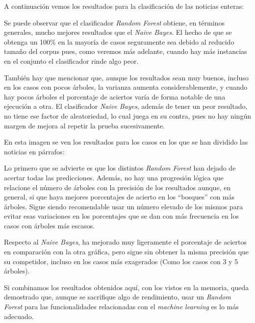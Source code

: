A continuación vemos los resultados para la clasificación de las noticias enteras:


Se puede observar que el clasificador \emph{Random Forest} obtiene, en términos generales, mucho mejores resultados que el \emph{Naive Bayes}. El hecho de que se obtenga un 100\% en la mayoría de casos seguramente sea debido al reducido tamaño del corpus pues, como veremos más adelante, cuando hay más instancias en el conjunto el clasificador rinde algo peor.

También hay que mencionar que, aunque los resultados sean muy buenos, incluso en los casos con pocos árboles, la varianza aumenta considerablemente, y cuando hay pocos árboles el porcentaje de aciertos varía de forma notable de una ejecución a otra. El clasificador \emph{Naive Bayes}, además de tener un peor resultado, no tiene ese factor de aleatoriedad, lo cual juega en su contra, pues no hay ningún margen de mejora al repetir la prueba sucesivamente.

En esta imagen se ven los resultados para los casos en los que se han dividido las noticias en párrafos:


Lo primero que se advierte es que los distintos \emph{Random Forest} han dejado de acertar todas las predicciones. Además, no hay una progresión lógica que relacione el número de árboles con la precisión de los resultados aunque, en general, si que haya mejores porcentajes de acierto en los ``bosques'' con más árboles. Sigue siendo recomendable usar un número elevado de los mismos para evitar esas variaciones en los porcentajes que se dan con más frecuencia en los casos con árboles más escasos.

Respecto al \emph{Naive Bayes}, ha mejorado muy ligeramente el porcentaje de aciertos en comparación con la otra gráfica, pero sigue sin obtener la misma precisión que su competidor, incluso en los casos más exagerados (Como los casos con 3 y 5 árboles).

Si combinamos los resultados obtenidos aquí, con los vistos en la memoria, queda demostrado que, aunque se sacrifique algo de rendimiento, usar un \emph{Random Forest} para las funcionalidades relacionadas con el \emph{machine learning} es lo más adecuado.